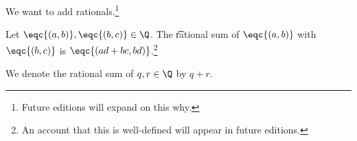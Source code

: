 

We want to add rationals.\footnote{Future editions will expand on this why.}


Let $\eqc{(a, b)}, \eqc{(b, c)} \in \Q$.
The \t{rational sum} of $\eqc{(a, b)}$ with $\eqc{(b, c)}$ is $\eqc{(ad + bc, bd)}$.\footnote{An account that this is well-defined will appear in future editions.}


We denote the rational sum of $q, r \in \Q$ by $q + r$.

\blankpage
